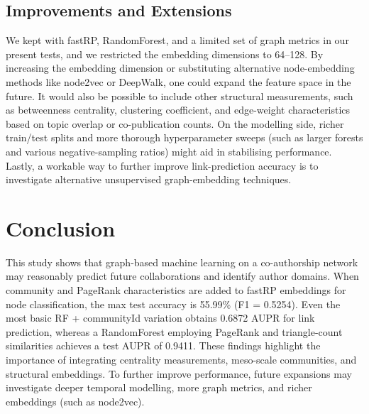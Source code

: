 \documentclass[conference]{IEEEtran}
\begin{document}
\subsection{Improvements and Extensions}

We kept with fastRP, RandomForest, and a limited set of graph metrics in our present tests, and we restricted the embedding dimensions to 64–128.  By increasing the embedding dimension or substituting alternative node-embedding methods like node2vec or DeepWalk, one could expand the feature space in the future.  It would also be possible to include other structural measurements, such as betweenness centrality, clustering coefficient, and edge-weight characteristics based on topic overlap or co-publication counts.  On the modelling side, richer train/test splits and more thorough hyperparameter sweeps (such as larger forests and various negative-sampling ratios) might aid in stabilising performance.  Lastly, a workable way to further improve link-prediction accuracy is to investigate alternative unsupervised graph-embedding techniques.

\section{Conclusion}
This study shows that graph-based machine learning on a co-authorship network may reasonably predict future collaborations and identify author domains.  When community and PageRank characteristics are added to fastRP embeddings for node classification, the max test accuracy is 55.99\% (F1 = 0.5254).  Even the most basic RF + communityId variation obtains 0.6872 AUPR for link prediction, whereas a RandomForest employing PageRank and triangle-count similarities achieves a test AUPR of 0.9411.  These findings highlight the importance of integrating centrality measurements, meso-scale communities, and structural embeddings.  To further improve performance, future expansions may investigate deeper temporal modelling, more graph metrics, and richer embeddings (such as node2vec).
\end{document}
